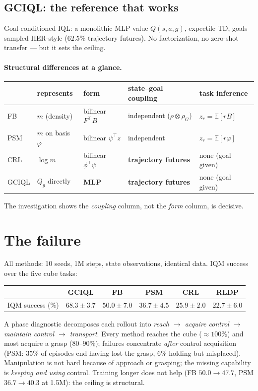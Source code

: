 \documentclass[11pt,a4paper]{article}
\newcommand{\E}{\mathbb{E}}
\begin{document}
\subsection{GCIQL: the reference that works}
Goal-conditioned IQL: a monolithic MLP value $Q(s,a,g)$, expectile TD, goals sampled HER-style
($62.5\%$ trajectory futures). No factorization, no zero-shot transfer --- but it sets the
ceiling.

\paragraph{Structural differences at a glance.}
\begin{center}\small
\begin{tabular}{@{}lllll@{}}
\toprule
 & represents & form & state--goal coupling & task inference\\
\midrule
FB & $m$ (density) & bilinear $F^{\top}B$ & independent ($\rho\otimes\rho_G$) & $z_r=\E[rB]$\\
PSM & $m$ on basis $\varphi$ & bilinear $\psi^{\top}z$ & independent & $z_r=\E[r\varphi]$\\
CRL & $\log m$ & bilinear $\phi^{\top}\psi$ & \textbf{trajectory futures} & none (goal given)\\
GCIQL & $Q_g$ directly & \textbf{MLP} & \textbf{trajectory futures} & none (goal given)\\
\bottomrule
\end{tabular}
\end{center}
The investigation shows the \emph{coupling} column, not the \emph{form} column, is decisive.

\section{The failure}\label{sec:failure}

All methods: 10 seeds, 1M steps, state observations, identical data. IQM success over the five
cube tasks:
\begin{center}\small
\begin{tabular}{@{}lccccc@{}}
\toprule
 & GCIQL & FB & PSM & CRL & RLDP\\
\midrule
IQM success (\%) & $68.3\pm3.7$ & $50.0\pm7.0$ & $36.7\pm4.5$ & $25.9\pm2.0$ & $22.7\pm6.0$\\
\bottomrule
\end{tabular}
\end{center}
A phase diagnostic decomposes each rollout into \emph{reach $\to$ acquire control $\to$ maintain
control $\to$ transport}. Every method reaches the cube ($\approx100\%$) and most acquire a grasp
($80$--$90\%$); failures concentrate \emph{after} control acquisition (PSM: $35\%$ of episodes end
having lost the grasp, $6\%$ holding but misplaced). Manipulation is not hard because of approach
or grasping; the missing capability is \emph{keeping and using} control. Training longer does not
help (FB $50.0\!\to\!47.7$, PSM $36.7\!\to\!40.3$ at 1.5M): the ceiling is structural.
\end{document}
